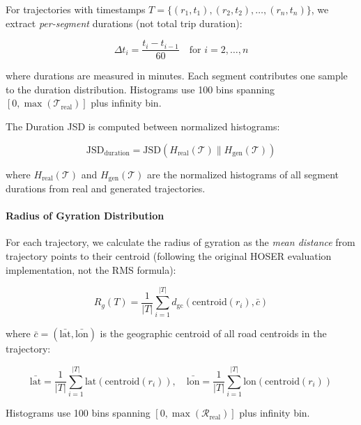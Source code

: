 For trajectories with timestamps $T = \{(r_1, t_1), (r_2, t_2), \ldots, (r_n, t_n)\}$, we extract \emph{per-segment} durations (not total trip duration):

\begin{equation}
\Delta t_i = \frac{t_i - t_{i-1}}{60} \quad \text{for } i = 2, \ldots, n
\label{eq:segment-duration}
\end{equation}

where durations are measured in minutes. Each segment contributes one sample to the duration distribution. Histograms use 100 bins spanning $[0, \max(\mathcal{T}_{\text{real}})]$ plus infinity bin.

The Duration JSD is computed between normalized histograms:

\begin{equation}
\text{JSD}_{\text{duration}} = \text{JSD}(H_{\text{real}}(\mathcal{T}) \parallel H_{\text{gen}}(\mathcal{T}))
\label{eq:duration-jsd}
\end{equation}

where $H_{\text{real}}(\mathcal{T})$ and $H_{\text{gen}}(\mathcal{T})$ are the normalized histograms of all segment durations from real and generated trajectories.

\paragraph{Radius of Gyration Distribution}

For each trajectory, we calculate the radius of gyration as the \emph{mean distance} from trajectory points to their centroid (following the original HOSER evaluation implementation, not the RMS formula):

\begin{equation}
R_g(T) = \frac{1}{|T|} \sum_{i=1}^{|T|} d_{\text{gc}}(\text{centroid}(r_i), \bar{c})
\label{eq:radius-gyration}
\end{equation}

where $\bar{c} = (\bar{\text{lat}}, \bar{\text{lon}})$ is the geographic centroid of all road centroids in the trajectory:

\begin{equation}
\bar{\text{lat}} = \frac{1}{|T|} \sum_{i=1}^{|T|} \text{lat}(\text{centroid}(r_i)), \quad
\bar{\text{lon}} = \frac{1}{|T|} \sum_{i=1}^{|T|} \text{lon}(\text{centroid}(r_i))
\label{eq:trajectory-centroid}
\end{equation}

Histograms use 100 bins spanning $[0, \max(\mathcal{R}_{\text{real}})]$ plus infinity bin.

